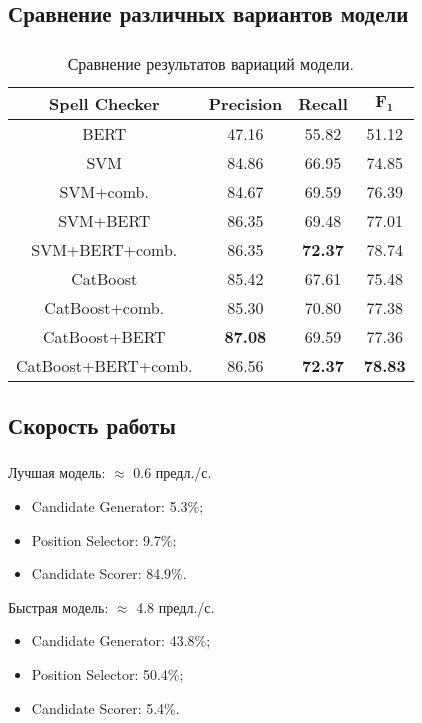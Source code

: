 \documentclass[t]{beamer}  %
\begin{document}
\subsection{Сравнение различных вариантов модели}
\begin{frame}
	\frametitle{\insertsection} 
	\framesubtitle{\insertsubsection}
	\begin{table}
		\begin{center}
			\small
			\begin{tabular}{c|c|c|c}
				\hline
				\textbf{Spell Checker} & \textbf{Precision}  & \textbf{Recall} & $\boldsymbol{F_1}$  \\
				\hline
				BERT & 47.16 & 55.82 & 51.12 \\
				SVM & 84.86  & 66.95 & 74.85  \\
				SVM+comb. & 84.67  & 69.59 & 76.39  \\
				SVM+BERT & 86.35  & 69.48 & 77.01  \\
				SVM+BERT+comb. & 86.35 & \textbf{72.37} & 78.74 \\
				CatBoost & 85.42  & 67.61 & 75.48  \\
				CatBoost+comb. & 85.30  & 70.80 & 77.38  \\
				CatBoost+BERT & \textbf{87.08}  & 69.59 & 77.36  \\
				CatBoost+BERT+comb. & 86.56 & \textbf{72.37} & \textbf{78.83} \\
				\hline
			\end{tabular}
		\end{center}
		\caption{Сравнение результатов вариаций модели.}
	\end{table}
\end{frame}

\subsection{Скорость работы}
\begin{frame}
	\frametitle{\insertsection} 
	\framesubtitle{\insertsubsection}
	Лучшая модель: $\approx$ 0.6 предл./с. 
	\begin{itemize}
		\item Candidate Generator: 5.3\%;
		\item Position Selector: 9.7\%;
		\item Candidate Scorer: 84.9\%.
	\end{itemize}
	
	Быстрая модель: $\approx$ 4.8 предл./с.
	\begin{itemize}
		\item Candidate Generator: 43.8\%;
		\item Position Selector: 50.4\%;
		\item Candidate Scorer: 5.4\%.
	\end{itemize}
\end{frame}
\end{document}
